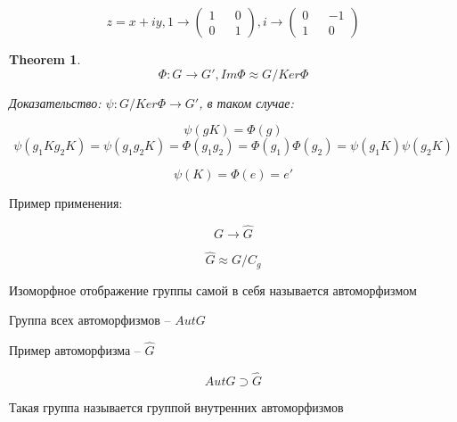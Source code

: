 \documentclass[10pt,a4paper]{article}
\newtheorem{thm}{Theorem}
\begin{document}
	\begin{equation}
		z = x + iy, 1 \rightarrow \begin{pmatrix}
		1 && 0 \\
		0 && 1
		\end{pmatrix}, i \rightarrow \begin{pmatrix}
		0 && -1\\
		1 && 0
		\end{pmatrix}
	\end{equation}
	
	\begin{thm}
		\begin{equation}
			\Phi: G\rightarrow G', Im \Phi \approx G/Ker \Phi
		\end{equation}
		
		\textit{Доказательство:} 
		$\psi : G/Ker \Phi \rightarrow G'$, в таком случае:
		
		\begin{equation}
			\psi\left(gK\right) = \Phi\left(g\right)
		\end{equation}
		\begin{equation}
			\psi\left(g_{1}Kg_{2}K\right) = \psi\left(g_{1}g_{2}K\right) = 
			\Phi\left(g_{1}g_{2}\right) = \Phi\left(g_{1}\right)
			\Phi\left(g_{2}\right) = 
			\psi\left(g_{1}K\right)\psi\left(g_{2}K\right)
		\end{equation}
		
		\begin{equation}
			\psi\left(K\right) = \Phi\left(e\right) = e'
		\end{equation}
	\end{thm}
	
	Пример применения:
	
	\begin{equation}
		G \rightarrow \hat{G}
	\end{equation}
	
	\begin{equation}
		\hat{G} \approx G/C_{g}
	\end{equation}
	
	Изоморфное отображение группы самой в себя называется автоморфизмом
	
	Группа всех автоморфизмов -- $AutG$
	
	Пример автоморфизма -- $\hat{G}$
	
	\begin{equation}
		AutG \supset \hat{G}
	\end{equation}
	
	Такая группа называется группой внутренних автоморфизмов
	
\end{document}
